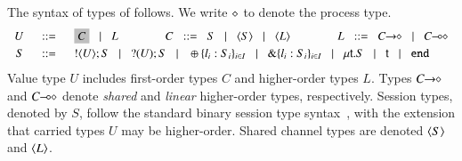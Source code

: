 \documentclass[runningheads]{llncs}
\begin{document}


The syntax of types of \HOp follows. We write $\diamond$ to denote the process type.
\[
	\begin{array}{rcl}
		U & \bnfis &	\nonhosyntax{C} \bnfbar L
		\qquad \qquad
		C  \bnfis		S \bnfbar \chtype{S} \bnfbar \chtype{L}
		\qquad \qquad
		L \bnfis		\shot{C} \bnfbar \lhot{C}
		\\[1mm]

		S & \bnfis &	\btout{U} S \bnfbar \btinp{U} S \bnfbar \btsel{l_i:S_i}_{i \in I}
						\bnfbar \btbra{l_i:S_i}_{i \in I} \bnfbar  \trec{t}{S} \bnfbar \vart{t}  \bnfbar \tinact
	\end{array}
\]
Value type $U$ includes
  first-order types $C$ and  higher-order
types $L$.
Types $C\!\! \rightarrow\!\! \diamond$ and $C\!\! \multimap\!\! \diamond$ denote
{\em shared} and {\em linear} higher-order 
types, respectively.
Session types, denoted by $S$, follow the standard binary session type syntax~\cite{honda.vasconcelos.kubo:language-primitives}, with
the extension that carried types $U$ may be higher-order.
Shared channel types are denoted $\langle S \rangle$ and $\langle L \rangle$.
\end{document}
